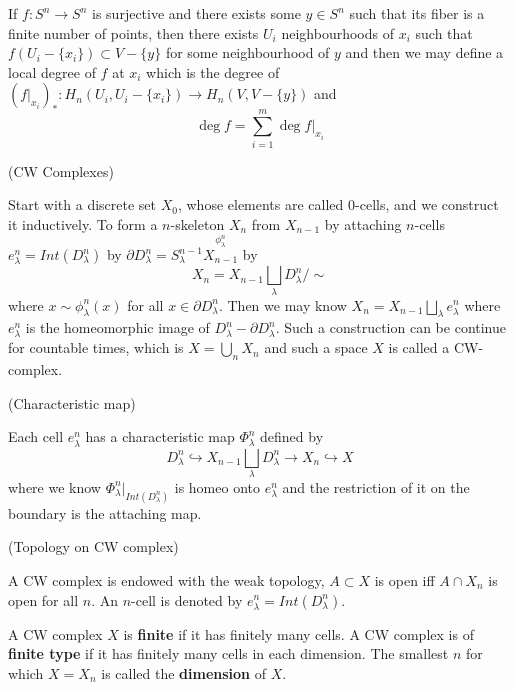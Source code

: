 \documentclass{article}
\begin{document}
\begin{theorem}
    If $f:S^n\to S^n$ is surjective and there exists some $y\in S^n$ such that its fiber is a finite number of points, then there exists $U_i$ neighbourhoods of $x_i$ such that $f(U_i-\{x_i\}) \subset V-\{y\}$ for some neighbourhood of $y$ and then we may define a local degree of $f$ at $x_i$ which is the degree of $(f|_{x_i})_*:H_n(U_i,U_i-\{x_i\}) \to H_n(V,V-\{y\})$ and
    \[
    \deg f = \sum\limits_{i=1}^m \deg f|_{x_i}
    \]
\end{theorem}

\begin{definition}(CW Complexes)\par
    Start with a discrete set $X_0$, whose elements are called $0$-cells, and we construct it inductively. To form a $n$-skeleton $X_n$ from $X_{n-1}$ by attaching $n$-cells $e_{\lambda}^n = Int(D_{\lambda}^n)$ by $\partial D_{\lambda}^n = S_{\lambda}^{n-1} \overset{\phi_{\lambda}^n}{X_{n-1}}$ by
    \[
    X_n = X_{n-1} \bigsqcup_{\lambda} D_{\lambda}^n/\sim
    \]
    where $x\sim \phi_{\lambda}^n(x)$ for all $x\in \partial D_{\lambda}^n$. Then we may know $X_n = X_{n-1}\bigsqcup_{\lambda} e_{\lambda}^n$ where $e_{\lambda}^n$ is the homeomorphic image of $D_{\lambda}^n - \partial D_{\lambda}^n$. Such a construction can be continue for countable times, which is $X = \bigcup_n X_n$ and such a space $X$ is called a CW-complex.
\end{definition}

\begin{definition}(Characteristic map)\par
    Each cell $e_{\lambda}^n$ has a characteristic map $\Phi_{\lambda}^n$ defined by
    \[D_{\lambda}^n \hookrightarrow X_{n-1}\bigsqcup_{\lambda} D_{\lambda}^n \to X_n \hookrightarrow X\]
    where we know $\Phi_{\lambda}^n|_{Int(D_{\lambda}^n)}$ is homeo onto $e_{\lambda}^n$ and the restriction of it on the boundary is the attaching map.\par
\end{definition}

\begin{definition}(Topology on CW complex)\par
    A CW complex is endowed with the weak topology, $A\subset X$ is open iff $A\cap X_n$ is open for all $n$. An $n$-cell is denoted by $e_{\lambda}^n = Int(D_{\lambda}^n)$.\par
    A CW complex $X$ is \textbf{finite} if it has finitely many cells. A CW complex is of \textbf{finite type} if it has finitely many cells in each dimension. The smallest $n$ for which $X=X_n$ is called the \textbf{dimension} of $X$.
\end{definition}
\end{document}
